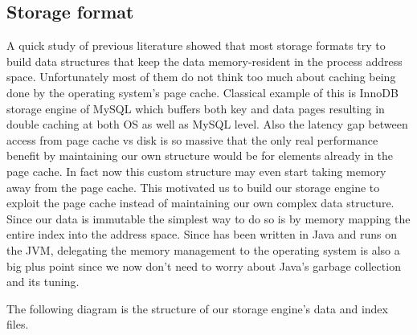 \documentclass[10pt,twocolumn,preprint,nonatbib,numbers]{sigplanconf}
\begin{document}

\subsection{Storage format}
\label{sec:read_only:storage_format}

A quick study of previous literature showed that most storage formats try to build data structures that keep the data memory-resident in the process address space. Unfortunately most of them do not think too much about caching being done by the operating system's page cache. Classical example of this is InnoDB storage engine of MySQL which buffers both key and data pages resulting in double caching 
at both OS as well as MySQL level. Also the latency gap between access from page cache vs disk is so massive that the only real performance benefit by maintaining our own structure would be for elements already in the page cache. In fact now this custom structure may even start taking memory away from the page cache. This motivated us to build our storage engine to exploit the page cache instead of maintaining our own complex data structure. Since our data is immutable the simplest way to do so is by memory mapping the entire index into the address space. Since \projectname{} has been written in Java and runs on the JVM, delegating the memory management to the operating system is also a big plus point since we now don't need to worry about Java's garbage collection and its tuning.

The following diagram is the structure of our storage engine's data and index files. 
\end{document}

